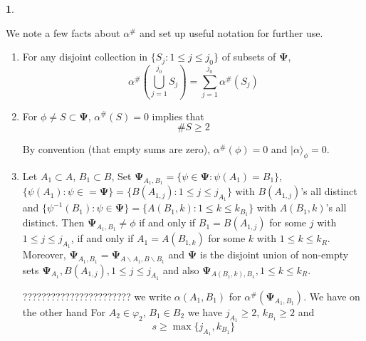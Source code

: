 \documentclass[a4paper,12pt]{article}
\theoremstyle{definition}
\theoremstyle{underlinethm}
\theoremstyle{definition}
\newtheorem{subsubsec}{}[subsection]
\begin{document}
\begin{subsubsec}\label{subsubsection-4.1.1}

We note a few facts about $\alpha^{\#}$ and set up useful notation for further use.

\begin{enumerate}[label=(\alph*)]
\item For any disjoint collection in $\{S_{j} : 1 \leq j \leq j_{0} \}$ of subsets of $\boldsymbol{\Psi}$,
\begin{equation}
\alpha^{\#} \left(\bigcup\limits_{j=1}^{j_{0}} S_{j} \right) = \sum\limits_{j=1}^{j_{0}} \alpha^{\#}(S_{j})\tag{4.1}\label{eq-4.1}
\end{equation}

\item For $\phi \neq S \subset \boldsymbol{\Psi}$, $\alpha^{\#}(S)=0$ implies that 
\begin{equation}
\# S \geq 2\tag{4.2}\label{eq-4.2}
\end{equation}

By convention (that empty sums are zero), $\alpha^{\#}(\phi)=0$ and $| \alpha \rangle_{\phi} =0$.

\item Let $A_{1} \subset A$, $B_{1} \subset B$, Set $\boldsymbol{\Psi}_{A_{1}, B_{1}} = \{\psi \in \boldsymbol{\Psi} : \psi(A_{1}) = B_{1}\}$, $\{\psi(A_{1}) : \psi \in = \boldsymbol{\Psi} \} = \{B(A_{1, j}) : 1 \leq j \leq j_{A_{1}} \}$ with $B(A_{1,j})$'s all distinct and $\{\psi^{-1}(B_{1}) : \psi \in  \boldsymbol{\Psi}\} = \{A(B_{1}, k) : 1\leq k \leq k_{B_{1}}\}$ with $A(B_{1}, k)$'s all distinct. Then $\boldsymbol{\Psi}_{A_{1}, B_{1}} \neq \phi$ if and only if $B_{1} = B(A_{1, j})$ for some $j$ with $1 \leq j \leq j_{A_{1}}$, if and only if $A_{1} = A(B_{1, k})$ for some $k$ with $1 \leq k \leq k_{R}$. Moreover, $\boldsymbol{\Psi}_{A_{1}, B_{1}} = \boldsymbol{\Psi}_{A \smallsetminus A_{1}, B \smallsetminus B_{1}}$ and $\boldsymbol{\Psi}$ is the disjoint union of non-empty sets $\boldsymbol{\Psi}_{A_{1}}, B(A_{1,j}), 1 \leq j \leq j_{A_{1}}$ and also $\boldsymbol{\Psi}_{A(B_{1}, k), B_{1}}, 1 \leq k \leq k_{R}$.

??????????????????????? we write $\alpha(A_{1}, B_{1})$ for $\alpha^{\#}(\boldsymbol{\Psi}_{A_{1}, B_{1}})$. We have on the other hand For $A_{2} \in \varphi_{2}$, $B_{1} \in B_{2}$ we have $j_{A_{1}} \geq 2$, $k_{B_{1}}\geq 2$ and 
\begin{equation}
s \geq \max\{j_{A_{1}}, k_{B_{1}}\}\tag{4.6}\label{eq-4.6}
\end{equation}
\end{enumerate}

\end{subsubsec}
\end{document}
